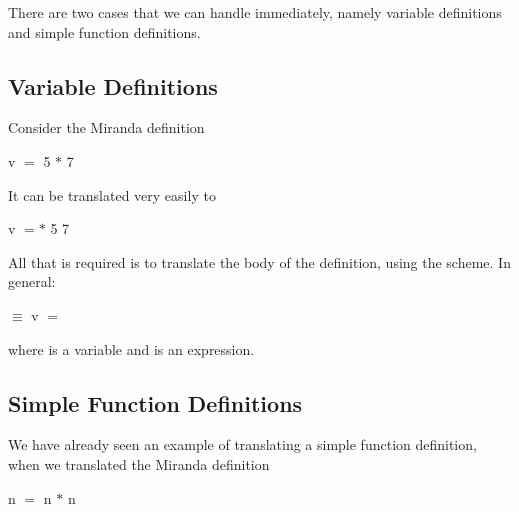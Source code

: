 There are two cases that we can handle immediately, namely variable definitions and simple function definitions.

\subsection{Variable Definitions}

Consider the Miranda definition
\begin{mlcoded}
    v $=$ 5 $*$ 7
\end{mlcoded}
It can be translated very easily to
\begin{mlcoded}
    v $= *$ 5 7
\end{mlcoded}
All that is required is to translate the body of the definition, using the  scheme. In general:
\begin{mlcoded}
     $\equiv$ v $=$ 
\end{mlcoded}
where  is a variable and  is an expression.

\subsection{Simple Function Definitions}
We have already seen an example of translating a simple function definition, when we translated the Miranda definition
\begin{mlcoded}
     n $=$ n $*$ n
\end{mlcoded}

